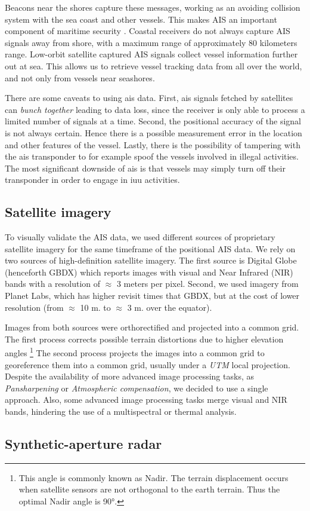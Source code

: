 Beacons near the shores capture these messages, working as an avoiding collision system with the sea coast and other vessels. This makes AIS an important component of maritime security \cite{Tetreault2005}. Coastal receivers do not always capture AIS signals away from shore, with a maximum range of approximately 80 kilometers range. Low-orbit satellite captured AIS signals collect vessel information further out at sea. This allows us to retrieve vessel tracking data from all over the world, and not only from vessels near seashores.

There are some caveats to using \gls{ais} data. First, \gls{ais} signals fetched by satellites can \textit{bunch together} leading to data loss, since the receiver is only able to process a limited number of signals at a time. Second, the positional accuracy of the signal is not always certain. Hence there is a possible measurement error in the location and other features of the vessel. Lastly, there is the possibility of tampering with the \gls{ais} transponder to for example spoof the vessels involved in illegal activities. The most significant downside of \gls{ais} is that vessels may simply turn off their transponder in order to engage in \gls{iuu} activities.

\subsection{Satellite imagery}
To visually validate the AIS data, we used different sources of proprietary satellite imagery for the same timeframe of the positional AIS data. We rely on two sources of high-definition satellite imagery. The first source is Digital Globe (henceforth GBDX) which reports images with visual and Near Infrared (NIR) bands with a resolution of $\approx$ 3 meters per pixel. Second, we used imagery from Planet Labs, which has higher revisit times that GBDX, but at the cost of lower resolution (from $\approx$ 10 m. to $\approx$ 3 m. over the equator). 

Images from both sources were orthorectified and projected into a common grid. The first process corrects possible terrain distortions due to higher elevation angles \footnote{This angle is commonly known as Nadir. The terrain displacement occurs when satellite sensors are not orthogonal to the earth terrain. Thus the optimal Nadir angle is \ang{90}.} The second process projects the images into a common grid to georeference them into a common grid, usually under a \textit{UTM} local projection. Despite the availability of more advanced image processing tasks, as \textit{Pansharpening} or \textit{Atmospheric compensation}, we decided to use a single approach. Also, some advanced image processing tasks merge visual and NIR bands, hindering the use of a multispectral or thermal analysis. 

\subsection{Synthetic-aperture radar}
